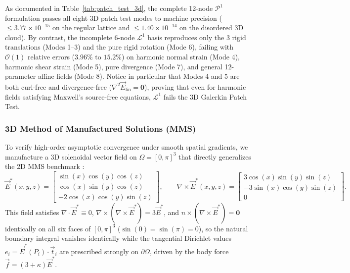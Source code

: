 \documentclass[preprint,12pt]{elsarticle}
\newcommand{\curl}{\nabla \times}
\newcommand{\divg}{\nabla \cdot}
\begin{document}
As documented in Table~\ref{tab:patch_test_3d}, the complete 12-node $\mathcal{P}^1$ formulation passes all eight 3D patch test modes to machine precision ($\le 3.77 \times 10^{-15}$ on the regular lattice and $\le 1.40 \times 10^{-14}$ on the disordered 3D cloud). By contrast, the incomplete 6-node $\mathcal{L}^1$ basis reproduces only the 3 rigid translations (Modes 1--3) and the pure rigid rotation (Mode 6), failing with $\mathcal{O}(1)$ relative errors ($3.96\%$ to $15.2\%$) on harmonic normal strain (Mode 4), harmonic shear strain (Mode 5), pure divergence (Mode 7), and general 12-parameter affine fields (Mode 8). Notice in particular that Modes 4 and 5 are both curl-free and divergence-free ($\nabla^2\vec{E}_{\text{lin}} = \mathbf{0}$), proving that even for harmonic fields satisfying Maxwell's source-free equations, $\mathcal{L}^1$ fails the 3D Galerkin Patch Test.

\subsubsection{3D Method of Manufactured Solutions (MMS)}
\label{subsubsec:mms_3d}

To verify high-order asymptotic convergence under smooth spatial gradients, we manufacture a 3D solenoidal vector field on $\Omega = [0,\pi]^3$ that directly generalizes the 2D MMS benchmark \cite{Mesquita2026VNMM2D}:
\begin{equation}
    \vec{E}^*(x,y,z) = \begin{bmatrix}
    \sin(x)\cos(y)\cos(z) \\
    \cos(x)\sin(y)\cos(z) \\
    -2\cos(x)\cos(y)\sin(z)
    \end{bmatrix}, \qquad
    \curl\vec{E}^*(x,y,z) = \begin{bmatrix}
    3\cos(x)\sin(y)\sin(z) \\
    -3\sin(x)\cos(y)\sin(z) \\
    0
    \end{bmatrix}.
    \label{eq:mms_exact_3d}
\end{equation}
This field satisfies $\divg\vec{E}^* \equiv 0$, $\curl(\curl\vec{E}^*) = 3\vec{E}^*$, and $\hat{n}\times(\curl\vec{E}^*) = \mathbf{0}$ identically on all six faces of $[0,\pi]^3$ ($\sin(0)=\sin(\pi)=0$), so the natural boundary integral vanishes identically while the tangential Dirichlet values $e_i = \vec{E}^*(P_i)\cdot\vec{t}_i$ are prescribed strongly on $\partial\Omega$, driven by the body force $\vec{f} = (3 + \kappa)\vec{E}^*$.
\end{document}
